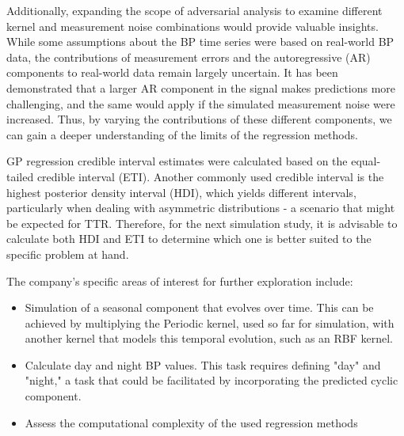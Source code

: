 Additionally, expanding the scope of adversarial analysis to examine different
kernel and measurement noise combinations would provide valuable insights.
While some assumptions about the BP time series were based on real-world BP data,
the contributions of measurement errors and the autoregressive (AR) components
to real-world data remain largely uncertain.
It has been demonstrated that a larger AR component in the signal makes predictions
more challenging, and the same would apply if the simulated measurement noise were increased.
Thus, by varying the contributions of these different components,
we can gain a deeper understanding of the limits of the regression methods.

GP regression credible interval estimates were calculated based on the equal-tailed
credible interval (ETI). Another commonly used credible interval is
the highest posterior density interval (HDI), which yields different intervals,
particularly when dealing with asymmetric distributions - a scenario that might be expected for TTR.
Therefore, for the next simulation study, it is advisable to calculate both HDI and ETI
to determine which one is better suited to the specific problem at hand.

The company's specific areas of interest for further exploration include:

\begin{itemize}
    \item Simulation of a seasonal component that evolves over time.
    This can be achieved by multiplying the Periodic kernel, used so far for simulation,
    with another kernel that models this temporal evolution, such as an RBF kernel.

    \item Calculate day and night BP values. This task requires defining "day" and "night," a task that could be
    facilitated by incorporating the predicted cyclic component.

    \item Assess the computational complexity of the used regression methods

\end{itemize}







